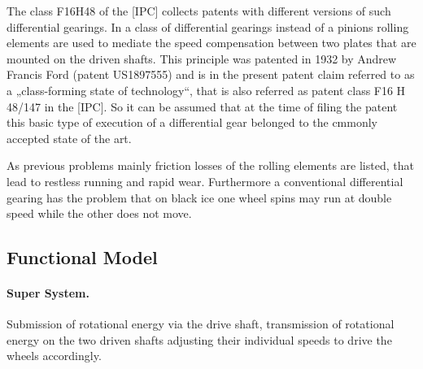 \documentclass[11pt,a4paper]{article}
\begin{document}
The class F16H48 of the [IPC] collects patents with different versions of such
differential gearings. In a class of differential gearings instead of a
pinions rolling elements are used to mediate the speed compensation between
two plates that are mounted on the driven shafts. This principle was patented
in 1932 by Andrew Francis Ford (patent US1897555) and is in the present patent
claim referred to as a „class-forming state of technology“, that is also
referred as patent class F16 H 48/147 in the [IPC]. So it can be assumed that
at the time of filing the patent this basic type of execution of a
differential gear belonged to the cmmonly accepted state of the art.

As previous problems mainly friction losses of the rolling elements are
listed, that lead to restless running and rapid wear. Furthermore a
conventional differential gearing has the problem that on black ice one wheel
spins may run at double speed while the other does not move.

\subsection{Functional Model}

\paragraph{Super System.}
Submission of rotational energy via the drive shaft, transmission of
rotational energy on the two driven shafts adjusting their individual speeds
to drive the wheels accordingly.
\end{document}

